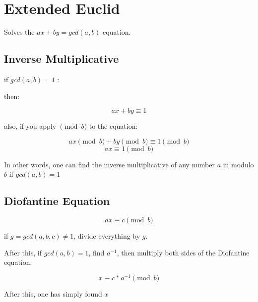 

\section{Extended Euclid}

    Solves the $ ax + by = gcd(a, b)$ equation.

    \subsection{Inverse Multiplicative}

    if \textbf{ $gcd(a, b) = 1$ }:

    then:

    $$ax + by \equiv 1$$

    also, if you apply $\pmod{b}$ to the equation:

    $$ ax \pmod{b} + by \pmod{b} \equiv 1 \pmod{b} $$
    $$ ax \equiv 1 \pmod{b} $$

    In other words, one can find the inverse multiplicative of any number $a$ in modulo $b$ if $gcd(a, b) = 1$

    \subsection{Diofantine Equation}

    $$ ax \equiv c \pmod{b} $$

    if $g = gcd({a, b, c}) \neq 1$, divide everything by $g$.

    After this, if $gcd(a, b) = 1$, find $a^{-1}$, then multiply both sides of the Diofantine equation.

    $$ x \equiv c * a^{-1} \pmod{b} $$

    After this, one has simply found $x$

